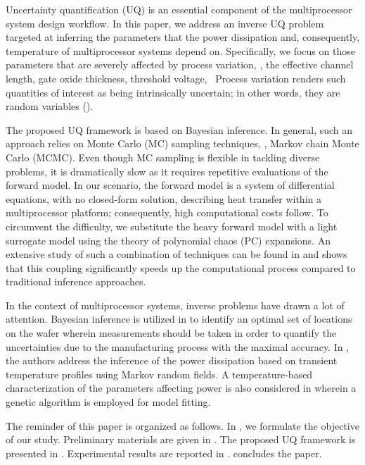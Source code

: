 Uncertainty quantification (UQ) is an essential component of the multiprocessor system design workflow. In this paper, we address an inverse UQ problem targeted at inferring the parameters that the power dissipation and, consequently, temperature of multiprocessor systems depend on. Specifically, we focus on those parameters that are severely affected by process variation, \eg, the effective channel length, gate oxide thickness, threshold voltage, \etc\ Process variation renders such quantities of interest as being intrinsically uncertain; in other words, they are random variables (\rvs).

The proposed UQ framework is based on Bayesian inference. In general, such an approach relies on Monte Carlo (MC) sampling techniques, \eg, Markov chain Monte Carlo (MCMC). Even though MC sampling is flexible in tackling diverse problems, it is dramatically slow as it requires repetitive evaluations of the forward model. In our scenario, the forward model is a system of differential equations, with no closed-form solution, describing heat transfer within a multiprocessor platform; consequently, high computational costs follow. To circumvent the difficulty, we substitute the heavy forward model with a light surrogate model using the theory of polynomial chaos (PC) expansions. An extensive study of such a combination of techniques can be found in \cite{marzouk2007, el-moselhy2012} and shows that this coupling significantly speeds up the computational process compared to traditional inference approaches.

In the context of multiprocessor systems, inverse problems have drawn a lot of attention. Bayesian inference is utilized in \cite{zhang2010} to identify an optimal set of locations on the wafer wherein measurements should be taken in order to quantify the uncertainties due to the manufacturing process with the maximal accuracy. In \cite{paek2012}, the authors address the inference of the power dissipation based on transient temperature profiles using Markov random fields. A temperature-based characterization of the parameters affecting power is also considered in \cite{mesa-martinez2007} wherein a genetic algorithm is employed for model fitting.

The reminder of this paper is organized as follows. In , we formulate the objective of our study. Preliminary materials are given in . The proposed UQ framework is presented in . Experimental results are reported in .  concludes the paper.
